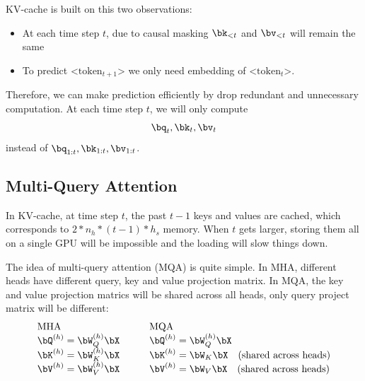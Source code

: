 \documentclass{article}
\begin{document}
KV-cache is built on this two observations:
\begin{itemize}
	\item At each time step $t$, due to causal masking $\bk_{<t}$ and $\bv_{<t}$ will remain the same
	\item To predict <$\text{token}_{t+1}$> we only need embedding of <$\text{token}_{t}$>.
\end{itemize}
Therefore, we can make prediction efficiently by drop redundant and unnecessary computation. At each time step $t$, we will only compute
\[
\bq_t, \bk_t, \bv_t
\]
instead of $\bq_{1:t}, \bk_{1:t}, \bv_{1:t}$.

\clearpage

\subsection{Multi-Query Attention}
In KV-cache, at time step $t$, the past $t-1$ keys and values are cached, which corresponds to $2 * n_h * (t-1) * h_s$ memory. 
When $t$ gets larger, storing them all on a single GPU will be impossible and the loading will slow things down.

The idea of multi-query attention (MQA) is quite simple. 
In MHA, different heads have different query, key and value projection matrix.
In MQA, the key and value projection matrics will be shared across all heads, only query project matrix will be different:
\[
\begin{array}{ll}
   \text{MHA} & \qquad \text{MQA} \\
  \bQ^{(h)} = \bW_Q^{(h)} \bX & \qquad  \bQ^{(h)} = \bW_Q^{(h)} \bX \\
  \bK^{(h)} = \bW_K^{(h)} \bX & \qquad  \bK^{(h)} = \bW_K \bX \quad \text{(shared across heads)} \\
  \bV^{(h)} = \bW_V^{(h)} \bX & \qquad  \bV^{(h)} = \bW_V \bX \quad \text{(shared across heads)}
\end{array}
\]
\end{document}
